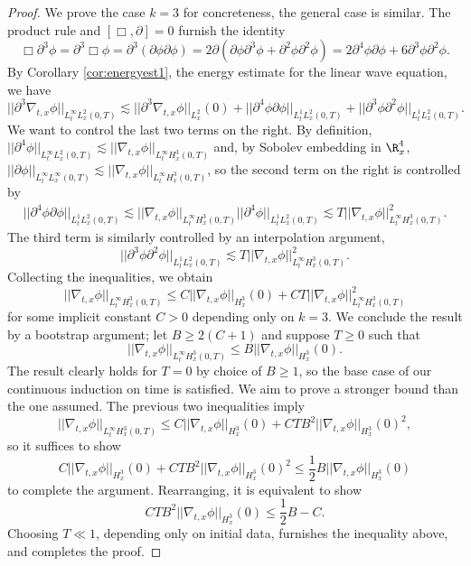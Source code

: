 \begin{proof}
	We prove the case $k = 3$ for concreteness, the general case is similar. The product rule and $[\Box, \partial] = 0$ furnish the identity
		\[ \Box \partial^3 \phi = \partial^3 \Box \phi = \partial^3 (\partial \phi \partial \phi) = 2 \partial( \partial \phi \partial^3 \phi +  \partial^2 \phi \partial^2 \phi) = 2 \partial^4 \phi \partial \phi +  6 \partial^3 \phi \partial^2 \phi. \]
	By Corollary \ref{cor:energyest1}, the energy estimate for the linear wave equation, we have
		\[ ||\partial^3 \nabla_{t, x} \phi ||_{L^\infty_t L^2_x (0, T)} \lesssim ||\partial^3 \nabla_{t, x} \phi||_{L^2_x} (0) + ||\partial^4 \phi \partial \phi||_{L^1_t L^2_x (0, T)} + ||\partial^3 \phi \partial^2 \phi||_{L^1_t L^2_x (0, T)}.  \]
	We want to control the last two terms on the right. By definition, $||\partial^4 \phi||_{L^\infty_t L^2_x (0, T)} \lesssim ||\nabla_{t, x} \phi||_{L^\infty_t H^3_x (0, T)}$ and, by Sobolev embedding in $\R^4_x$, $||\partial \phi||_{L^\infty_t L^\infty_x (0, T)} \lesssim ||\nabla_{t, x} \phi||_{L^\infty_t H^3_x (0, T)}$, so the second term on the right is controlled by
		\begin{align*}
			||\partial^4 \phi \partial \phi||_{L^1_t L^2_x (0, T)} \lesssim ||\nabla_{t, x} \phi||_{L^\infty_t H^3_x (0, T)} ||\partial^4 \phi||_{L^1_t L^2_x (0, T)} \lesssim T ||\nabla_{t, x} \phi||_{L^\infty_t H^3_x (0, T)}^2.
		\end{align*}
	The third term is similarly controlled by an interpolation argument, 
		\[ ||\partial^3 \phi \partial^2 \phi||_{L^1_t L^2_x (0, T)} \lesssim T ||\nabla_{t, x} \phi||_{L^\infty_t H^3_x (0, T)}^2. \]
	Collecting the inequalities, we obtain
		\[ ||\nabla_{t, x} \phi||_{L^\infty_t H^3_x (0, T)} \leq C ||\nabla_{t, x} \phi||_{H^3_x} (0) + C T || \nabla_{t, x} \phi||_{L^\infty_t H^3_x (0, T)}^2 \]
	for some implicit constant $C > 0$ depending only on $k = 3$. We conclude the result by a bootstrap argument; let $B \geq 2(C + 1)$ and suppose $T \geq 0$ such that 
		\[ ||\nabla_{t, x} \phi||_{L^\infty_t H^3_x (0, T)} \leq B ||\nabla_{t, x} \phi||_{H^3_x} (0). \]
	The result clearly holds for $T = 0$ by choice of $B \geq 1$, so the base case of our continuous induction on time is satisfied. We aim to prove a stronger bound than the one assumed.	The previous two inequalities imply
		\[ ||\nabla_{t, x} \phi||_{L^\infty_t H^3_x (0, T)} \leq C ||\nabla_{t, x} \phi||_{H^3_x} (0) + C T B^2 ||\nabla_{t, x} \phi||_{H^3_x} (0)^2, \]
	so it suffices to show
		\[ C ||\nabla_{t, x} \phi||_{H^3_x} (0) + C T B^2 ||\nabla_{t, x} \phi||_{H^3_x} (0)^2\leq \frac12 B||\nabla_{t, x} \phi||_{H^3_x} (0)\]
	to complete the argument. Rearranging, it is equivalent to show
		\[ CTB^2||\nabla_{t, x} \phi||_{H^3_x} (0) \leq \frac12 B - C.\]	
	Choosing $T \ll 1$, depending only on initial data, furnishes the inequality above, and completes the proof. 	
\end{proof}

